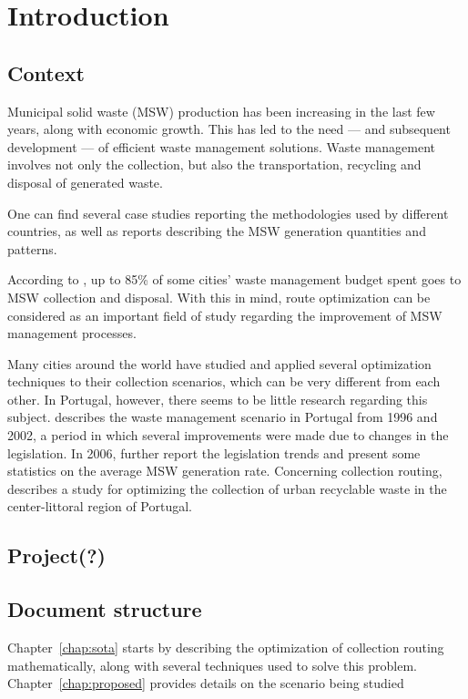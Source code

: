 \chapter{Introduction} \label{chap:intro}

\section*{}


\section{Context}

Municipal solid waste (MSW) production has been increasing in the last few
years, along with economic growth\citep{McCarthy94}. This has led to the need
--- and subsequent development --- of efficient waste management solutions.
Waste management involves not only the collection, but also the transportation,
recycling and disposal of generated waste.

One can find several case studies reporting the methodologies used by different
countries, as well as reports describing the MSW generation quantities and
patterns.

According to \citet{Bhat1996}, up to 85\% of some cities' waste management
budget spent goes to MSW collection and disposal. With this in mind, route
optimization can be considered as an important field of study regarding the
improvement of MSW management processes.

Many cities around the world have studied and applied several optimization
techniques to their collection scenarios, which can be very different from each
other. In Portugal, however, there seems to be little research regarding this
subject. \citet{Passaro200397} describes the waste management scenario in
Portugal from 1996 and 2002, a period in which several improvements were made
due to changes in the legislation. In 2006, \citet{Magrinho20061477} further
report the legislation trends and present some statistics on the average MSW
generation rate. Concerning collection routing, \citet{Teixeira04} describes a
study for optimizing the collection of urban recyclable waste in the
center-littoral region of Portugal.


\section{Project(?)}

\section{Document structure}


Chapter~\ref{chap:sota} starts by describing the optimization of collection
routing mathematically, along with several techniques used to solve this
problem. Chapter~\ref{chap:proposed} provides details on the scenario being
studied


